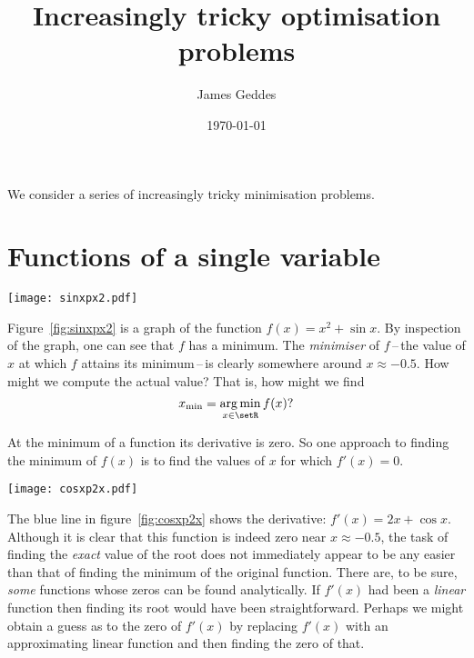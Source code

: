 \documentclass[10pt, a4paper]{article}
\title{Increasingly tricky optimisation problems}
\author{James Geddes}
\date{\today}
\DeclareMathOperator*{\argmin}{arg\,min}
\begin{document}
\maketitle

We consider a series of increasingly tricky minimisation
problems.

\section{Functions of a single variable}\label{sec:univariate}
\begin{marginfigure}
  \centering
  \texttt{[image: sinxpx2.pdf]}
  \label{fig:sinxpx2}
\end{marginfigure}

Figure~\ref{fig:sinxpx2} is a graph of the function
$f(x) = x^2+\sin x$. By inspection of the graph, one can see that $f$
has a minimum. The \emph{minimiser} of $f$\,--\,the value of $x$ at
which $f$ attains its minimum\,--\,is clearly somewhere around
$x \approx -0.5$. How might we compute the actual value? That is, how
might we find
\begin{equation*}
  x_\text{min} = \argmin_{x\in\setR} f(x)?
\end{equation*}

At the minimum of a function its derivative is zero. So one approach
to finding the minimum of $f(x)$ is to find the values of $x$ for
which $f'(x)=0$.

\begin{marginfigure}
  \centering \texttt{[image: cosxp2x.pdf]} 
  \label{fig:cosxp2x}
\end{marginfigure}

The blue line in figure~\ref{fig:cosxp2x} shows the derivative:
$f'(x) = 2x+\cos x$. Although it is clear that this function is indeed
zero near $x\approx-0.5$, the task of finding the \emph{exact} value of the
root does not immediately appear to be any easier than that of finding
the minimum of the original function. There are, to be sure,
\emph{some} functions whose zeros can be found analytically. If
$f'(x)$ had been a \emph{linear} function then finding its root would
have been straightforward. Perhaps we might obtain a guess as to the
zero of $f'(x)$ by replacing $f'(x)$ with an approximating linear
function and then finding the zero of that.
\end{document}

